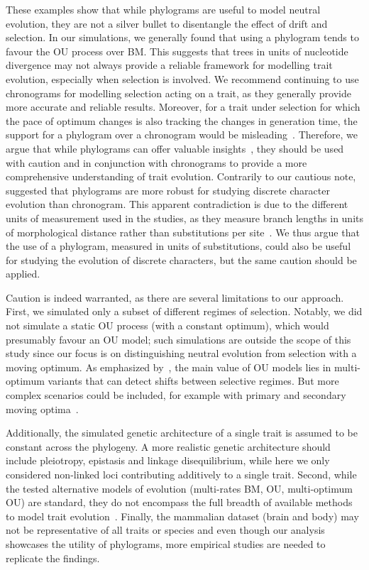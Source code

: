 \documentclass{article}
\begin{document}
These examples show that while phylograms are useful to model neutral evolution, they are not a silver bullet to disentangle the effect of drift and selection.
In our simulations, we generally found that using a phylogram tends to favour the OU process over BM.
This suggests that trees in units of nucleotide divergence may not always provide a reliable framework for modelling trait evolution, especially when selection is involved.
We recommend continuing to use chronograms for modelling selection acting on a trait, as they generally provide more accurate and reliable results.
Moreover, for a trait under selection for which the pace of optimum changes is also tracking the changes in generation time, the support for a phylogram over a chronogram would be misleading~\citep{litsios_effects_2012}.
Therefore, we argue that while phylograms can offer valuable insights~\citep{wilson_chronogram_2022}, they should be used with caution and in conjunction with chronograms to provide a more comprehensive understanding of trait evolution.
Contrarily to our cautious note, \citet{wilson_chronogram_2022} suggested that phylograms are more robust for studying discrete character evolution than chronogram.
This apparent contradiction is due to the different units of measurement used in the studies, as they measure branch lengths in units of morphological distance rather than substitutions per site~\citep{wilson_chronogram_2022}.
We thus argue that the use of a phylogram, measured in units of substitutions, could also be useful for studying the evolution of discrete characters, but the same caution should be applied.

Caution is indeed warranted, as there are several limitations to our approach.
First, we simulated only a subset of different regimes of selection.
Notably, we did not simulate a static OU process (with a constant optimum), which would presumably favour an OU model; such simulations are outside the scope of this study since our focus is on distinguishing neutral evolution from selection with a moving optimum.
As emphasized by~\citet{grabowski_cautionary_2023}, the main value of OU models lies in multi-optimum variants that can detect shifts between selective regimes.
But more complex scenarios could be included, for example with primary and secondary moving optima~\citep{hansen_three_2024}.

Additionally, the simulated genetic architecture of a single trait is assumed to be constant across the phylogeny.
A more realistic genetic architecture should include pleiotropy, epistasis and linkage disequilibrium, while here we only considered non-linked loci contributing additively to a single trait.
Second, while the tested alternative models of evolution (multi-rates BM, OU, multi-optimum OU) are standard, they do not encompass the full breadth of available methods to model trait evolution~\citep{pennell_geiger_2014, hohna_revbayes_2016}.
Finally, the mammalian dataset (brain and body) may not be representative of all traits or species and even though our analysis showcases the utility of phylograms, more empirical studies are needed to replicate the findings.
\end{document}
